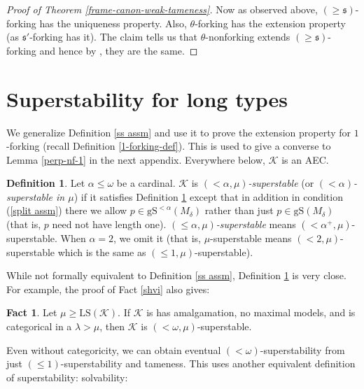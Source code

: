 \documentclass[12pt]{amsart}
\theoremstyle{definition}
\newtheorem{defin}[mydef]{Definition}
\newtheorem{fact}[mydef]{Fact}
\begin{document}
\begin{proof}[Proof of Theorem \ref{frame-canon-weak-tameness}]
  Now as observed above, $(\ge {\mathfrak{s}})$-forking has the uniqueness property. Also, $\theta$-forking has the extension property (as ${\mathfrak{s}}'$-forking has it). The claim tells us that $\theta$-nonforking extends $(\ge {\mathfrak{s}})$-forking and hence by \cite[Lemma 4.1]{bgkv-v2}, they are the same.
\end{proof}

\section{Superstability for long types}

We generalize Definition \ref{ss assm} and use it to prove the extension property for $1$-forking (recall Definition \ref{1-forking-def}). This is used to give a converse to Lemma \ref{perp-nf-1} in the next appendix. Everywhere below, ${\mathcal{K}}$ is an AEC.

\begin{defin}\label{ss-parametrized}
  Let $\alpha \le \omega$ be a cardinal. ${\mathcal{K}}$ is \emph{$(<\alpha, \mu)$-superstable} (or \emph{$(<\alpha)$-superstable in $\mu$}) if it satisfies Definition \ref{ss-parametrized} except that in addition in condition (\ref{split assm}) there we allow $p \in {\text{gS}}^{<\alpha} (M_\delta)$ rather than just $p \in {\text{gS}} (M_\delta)$ (that is, $p$ need not have length one). \emph{$(\le \alpha, \mu)$-superstable} means $(<\alpha^+, \mu)$-superstable. When $\alpha = 2$, we omit it (that is, $\mu$-superstable means $(< 2, \mu)$-superstable which is the same as $(\le 1, \mu)$-superstable).
\end{defin}

While not formally equivalent to Definition \ref{ss assm}, Definition \ref{ss-parametrized} is very close. For example, the proof of Fact \ref{shvi} also gives:

\begin{fact}\label{shvi2} 
  Let $\mu \ge {\text{LS}} ({\mathcal{K}})$. If ${\mathcal{K}}$ is has amalgamation, no maximal models, and is categorical in a $\lambda > \mu$, then ${\mathcal{K}}$ is $(<\omega, \mu)$-superstable.
\end{fact}

Even without categoricity, we can obtain eventual $(<\omega)$-superstability from just $(\le 1)$-superstability and tameness. This uses another equivalent definition of superstability: solvability:
\end{document}
